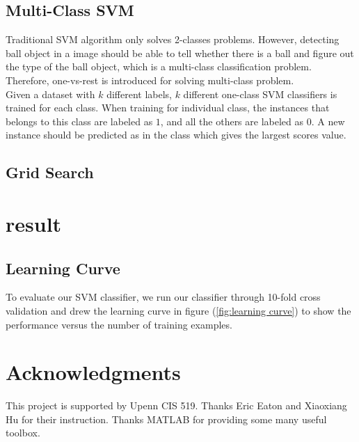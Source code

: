 \documentclass{article}
\begin{document}
\subsection{Multi-Class SVM}
Traditional SVM algorithm only solves 2-classes problems. However, detecting ball object in a image should be able to tell whether there is a ball and figure out the type of the ball object, which is a multi-class classification problem. Therefore, one-vs-rest is introduced for solving multi-class problem.\\
Given a dataset with $k$ different labels, $k$ different one-class SVM classifiers is trained for each class. When training for individual class, the instances that belongs to this class are labeled as $1$, and all the others are labeled as $0$. A new instance should be predicted as in the class which gives the largest scores value.\\
\subsection{Grid Search}

\section{result}
\subsection{Learning Curve}
To evaluate our SVM classifier, we run our classifier through 10-fold cross validation and drew the learning curve in figure (\ref{fig:learning curve}) to show the performance versus the number of training examples. 


\section*{Acknowledgments}
This project is supported by Upenn CIS 519. Thanks Eric Eaton and Xiaoxiang Hu for their instruction. Thanks MATLAB for providing some many useful toolbox.



\end{document}
